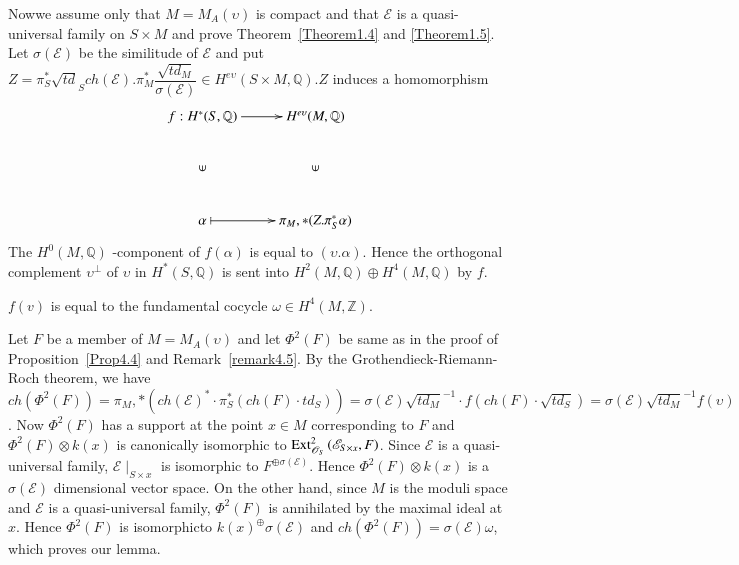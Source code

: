 Now\pageoriginale we assume only that $M=M_A(\upsilon)$ is compact and that
$\mathscr{E}$ is a quasi-universal family on $S\times M$ and prove
Theorem~\ref{Theorem1.4} and \ref{Theorem1.5}. Let
$\sigma(\mathscr{E})$ be the similitude of $\mathscr{E}$ and put
$Z=\pi^{\ast}_{S}\sqrt{td}_Sch(\mathscr{E}).\pi^{\ast}_M\dfrac{\sqrt{td_M}}{\sigma(\mathscr{E})}\in
H^{e\upsilon}(S\times M,\mathbb{Q}). Z$ induces a homomorphism
$$
\xymatrix{f:H^{\ast}(S,\mathbb{Q})\ar[r]&H^{e\upsilon}(M,\mathbb{Q})\\
\mbox{\rotatebox{90}{$\in$}} & \mbox{\rotatebox{90}{$\in$}}\\
\alpha\ar@{|->}[r]&\pi_M,\ast(Z.\pi^{\ast}_S\alpha)}
$$
The $H^{0}(M,\mathbb{Q})$ -component of $f(\alpha)$ is equal to
$(\upsilon.\alpha)$. Hence the orthogonal complement $\upsilon^{\perp}$
of $\upsilon$ in $H^{\ast}(S,\mathbb{Q})$ is sent into
$H^{2}(M,\mathbb{Q})\oplus H^{4}(M,\mathbb{Q})$ by $f$. 

\begin{lemma}\label{lemma4.11}
$f(v)$ is equal to the fundamental cocycle $\omega \in H^{4}(M,\mathbb{Z})$.
\end{lemma}

\begin{Proof}
Let $F$ be a member of $M=M_A(\upsilon)$ and let $\Phi^{2}(F)$ be same
as in the proof of Proposition~\ref{Prop4.4} and
Remark~\ref{remark4.5}. By the Grothendieck-Riemann-Roch theorem, we
have $ch(\Phi^{2}(F))=\pi_M,\ast
(ch(\mathscr{E})^{\ast}\cdot \pi^{\ast}_S(ch(F)\cdot
td_S))=\sigma(\mathscr{E})\sqrt{td_M}^{-1}\cdot
f(ch(F)\cdot \sqrt{td_S})=\sigma(\mathscr{E})\sqrt{td_M}^{-1}f(\upsilon)$. Now
$\Phi^{2}(F)$ has a support at the point $x\in M$ corresponding to $F$
and $\Phi^{2}(F)\otimes k(x)$ is canonically isomorphic to
$\mathrm{Ext}^{2}_{\mathscr{O}_S}\left(\mathscr{E}_{S\times x},F\right)$. Since
$\mathscr{E}$ is a quasi-universal family, $\mathscr{E}\mid_{S\times
x}$ is isomorphic to $F^{\oplus \sigma (\mathscr{E})}$. Hence
$\Phi^{2}(F)\otimes k(x)$ is a $\sigma(\mathscr{E})$ dimensional
vector space. On the other hand, since $M$ is the moduli space and
$\mathscr{E}$ is a quasi-universal family, $\Phi^{2}(F)$ is
annihilated by the maximal ideal at $x$. Hence $\Phi^{2}(F)$ is
isomorphic\pageoriginale to $k(x)^{\oplus} \sigma(\mathscr{E})$ and
$ch(\Phi^{2}(F))=\sigma(\mathscr{E})\omega$, which proves our lemma.
\enprf
\end{Proof}

